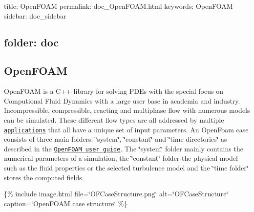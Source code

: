 

 title\+: Open\+F\+O\+AM permalink\+: doc\+\_\+\+Open\+F\+O\+A\+M.\+html keywords\+: Open\+F\+O\+AM sidebar\+: doc\+\_\+sidebar \subsection*{folder\+: doc }

\subsection*{Open\+F\+O\+AM}

Open\+F\+O\+AM is a C++ library for solving P\+D\+Es with the special focus on Computional Fluid Dynamics with a large user base in academia and industry. Incompressible, compressible, reacting and multiphase flow with numerous models can be simulated. These different flow types are all addressed by multiple \href{https://www.openfoam.com/documentation/user-guide/a-reference/a.1-standard-solvers}{\tt applications} that all have a unique set of input parameters. An Open\+Foam case consists of three main folders\+: \char`\"{}system\char`\"{}, \char`\"{}constant\char`\"{} and \char`\"{}time directories\char`\"{} as described in the \href{https://www.openfoam.com/documentation/user-guide/2-openfoam-cases/2.1-file-structure-of-openfoam-cases}{\tt Open\+F\+O\+AM user guide}. The \char`\"{}system\char`\"{} folder mainly contains the numerical parameters of a simulation, the \char`\"{}constant\char`\"{} folder the physical model such as the fluid properties or the selected turbulence model and the \char`\"{}time folder\char`\"{} stores the computed fields.

\{\% include image.\+html file=\char`\"{}\+O\+F\+Case\+Structure.\+png\char`\"{} alt=\char`\"{}\+O\+F\+Case\+Structure\char`\"{} caption=\char`\"{}\+Open\+F\+O\+A\+M case structure\char`\"{} \%\} 